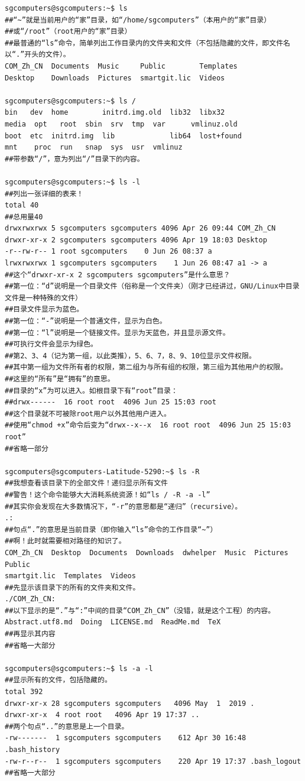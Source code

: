 \begin{verbatim}
sgcomputers@sgcomputers:~$ ls
##“~”就是当前用户的“家”目录，如“/home/sgcomputers”（本用户的“家”目录）
##或“/root”（root用户的“家”目录）
##最普通的“ls”命令，简单列出工作目录内的文件夹和文件（不包括隐藏的文件，即文件名以“.”开头的文件）。
COM_Zh_CN  Documents  Music     Public        Templates
Desktop    Downloads  Pictures  smartgit.lic  Videos

sgcomputers@sgcomputers:~$ ls /
bin   dev  home        initrd.img.old  lib32  libx32      
media  opt   root  sbin  srv  tmp  var      vmlinuz.old
boot  etc  initrd.img  lib             lib64  lost+found  
mnt    proc  run   snap  sys  usr  vmlinuz
##带参数“/”，意为列出“/”目录下的内容。

sgcomputers@sgcomputers:~$ ls -l
##列出一张详细的表来！
total 40
##总用量40
drwxrwxrwx 5 sgcomputers sgcomputers 4096 Apr 26 09:44 COM_Zh_CN
drwxr-xr-x 2 sgcomputers sgcomputers 4096 Apr 19 18:03 Desktop
-r--rw-r-- 1 root sgcomputers    0 Jun 26 08:37 a
lrwxrwxrwx 1 sgcomputers sgcomputers    1 Jun 26 08:47 a1 -> a
##这个“drwxr-xr-x 2 sgcomputers sgcomputers”是什么意思？
##第一位：“d”说明是一个目录文件（俗称是一个文件夹）（刚才已经讲过，GNU/Linux中目录文件是一种特殊的文件）
##目录文件显示为蓝色。
##第一位：“-”说明是一个普通文件，显示为白色。
##第一位：“l”说明是一个链接文件。显示为天蓝色，并且显示源文件。
##可执行文件会显示为绿色。
##第2、3、4（记为第一组，以此类推），5、6、7，8、9、10位显示文件权限。
##其中第一组为文件所有者的权限，第二组为与所有组的权限，第三组为其他用户的权限。
##这里的“所有”是“拥有”的意思。
##目录的“x”为可以进入。如根目录下有“root”目录：
##drwx------  16 root root  4096 Jun 25 15:03 root
##这个目录就不可被除root用户以外其他用户进入。
##使用“chmod +x”命令后变为“drwx--x--x  16 root root  4096 Jun 25 15:03 root”
##省略一部分

sgcomputers@sgcomputers-Latitude-5290:~$ ls -R
##我想查看该目录下的全部文件！递归显示所有文件
##警告！这个命令能够大大消耗系统资源！如“ls / -R -a -l”
##其实你会发现在大多数情况下，“-r”的意思都是“递归”（recursive）。
.:
##句点“.”的意思是当前目录（即你输入“ls”命令的工作目录“~”）
##啊！此时就需要相对路径的知识了。
COM_Zh_CN  Desktop  Documents  Downloads  dwhelper  Music  Pictures  Public 
smartgit.lic  Templates  Videos
##先显示该目录下的所有的文件夹和文件。
./COM_Zh_CN:
##以下显示的是“.”与“:”中间的目录“COM_Zh_CN”（没错，就是这个工程）的内容。
Abstract.utf8.md  Doing  LICENSE.md  ReadMe.md  TeX
##再显示其内容
##省略一大部分

sgcomputers@sgcomputers:~$ ls -a -l
##显示所有的文件，包括隐藏的。
total 392
drwxr-xr-x 28 sgcomputers sgcomputers   4096 May  1  2019 .
drwxr-xr-x  4 root root   4096 Apr 19 17:37 ..
##两个句点“..”的意思是上一个目录。
-rw-------  1 sgcomputers sgcomputers    612 Apr 30 16:48 .bash_history
-rw-r--r--  1 sgcomputers sgcomputers    220 Apr 19 17:37 .bash_logout
##省略一大部分
\end{verbatim}
